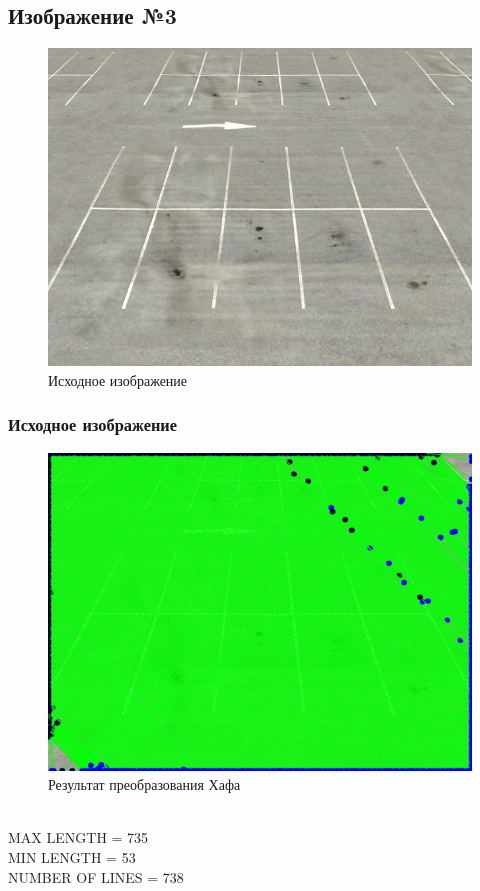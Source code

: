 \subsection{Изображение №3}

\begin{figure}[H]
    \includegraphics[width=\textwidth]{../source/4.png}
    \caption{Исходное изображение}
    \label{fig:source_image}
\end{figure}

\subsubsection{Исходное изображение}

\begin{figure}[H]
    \includegraphics[width=\textwidth]{../outputs/image3_ordinary.png}
    \caption{Результат преобразования Хафа}
    \label{fig:image3_ordinary}
\end{figure}
\ \\
MAX LENGTH = 735 \\
MIN LENGTH = 53 \ \\
NUMBER OF LINES = 738

